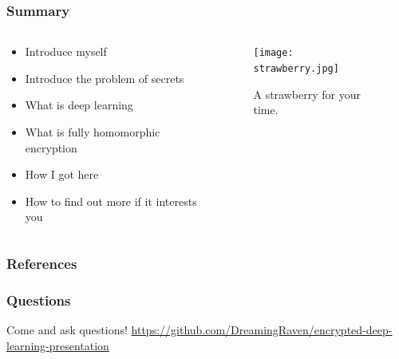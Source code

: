\documentclass[aspectratio=169]{beamer}
\begin{document}
  \begin{frame}
    \frametitle{Summary}
    \begin{columns}
      \begin{column}{0.5\textwidth}
        \begin{itemize}
          \item Introduce myself
          \item Introduce the problem of secrets
          \item What is deep learning
          \item What is fully homomorphic encryption
          \item How I got here
          \item How to find out more if it interests you
        \end{itemize}
      \end{column}
      \begin{column}{0.5\textwidth}
        \begin{figure}[th!]
          \centering
          \texttt{[image: strawberry.jpg]}
          \caption{A strawberry for your time.}
          \label{fig:strawberry}
        \end{figure}
      \end{column}
    \end{columns}
  \end{frame}

  \begin{frame}[allowframebreaks]
    \frametitle{References}
    \printbibliography
  \end{frame}

  \begin{frame}
      \frametitle{Questions}
      Come and ask questions!
      \url{https://github.com/DreamingRaven/encrypted-deep-learning-presentation}
  \end{frame}
\end{document}
